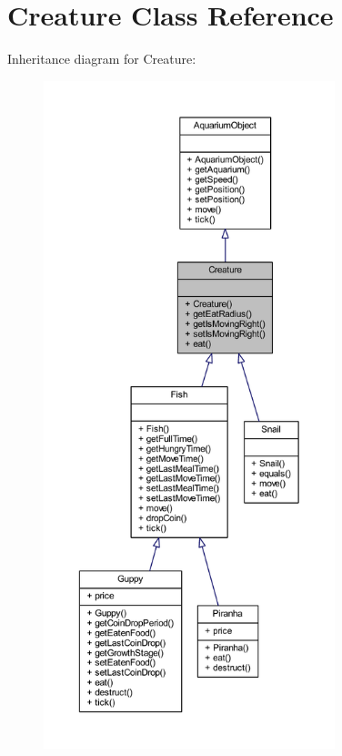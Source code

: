 \hypertarget{class_creature}{}\section{Creature Class Reference}
\label{class_creature}


Inheritance diagram for Creature\+:
\nopagebreak
\begin{figure}[H]
\begin{center}
\leavevmode
\includegraphics[height=550pt]{class_creature__inherit__graph}
\end{center}
\end{figure}


